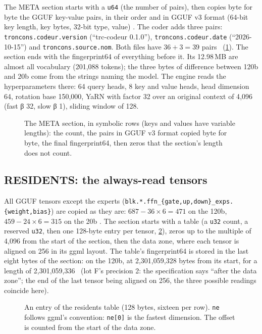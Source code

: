 The META section starts with a \texttt{u64} (the number of pairs), then copies byte for byte the GGUF key-value pairs, in their order and in GGUF v3 format (64-bit key length, key bytes, 32-bit type, value) \cite{ggml_gguf}. The coder adds three pairs: \nolinkurl{troncons.codeur.version} (``trc-codeur 0.1.0''), \nolinkurl{troncons.codeur.date} (``2026-10-15'') and \nolinkurl{troncons.source.nom}. Both files have $36 + 3 = 39$ pairs \mes~(\cref{t2fmt:fig:meta}). The section ends with the fingerprint64 of everything before it. Its 12.98\,MB are almost all vocabulary (201{,}088 tokens); the three bytes of difference between 120b and 20b come from the strings naming the model. The engine reads the hyperparameters there: 64 query heads, 8 key and value heads, head dimension 64, rotation base 150{,}000, YaRN with factor 32 over an original context of 4{,}096 (fast β 32, slow β 1), sliding window of 128.

\begin{figure}[ht]
\centering
\TdFmtMeta
\caption[The META section]{The META section, in symbolic rows (keys and values have variable lengths): the count, the pairs in GGUF v3 format copied byte for byte, the final fingerprint64, then zeros that the section's length does not count.}
\label{t2fmt:fig:meta}
\end{figure}

\subsection{RESIDENTS: the always-read tensors}

All GGUF tensors except the experts (\nolinkurl{blk.*.ffn_{gate,up,down}_exps.{weight,bias}}) are copied as they are: $687 - 36 \times 6 = 471$ on the 120b, $459 - 24 \times 6 = 315$ on the 20b \calc. The section starts with a table (a \texttt{u32} count, a reserved \texttt{u32}, then one 128-byte entry per tensor, \cref{t2fmt:fig:resident}), zeros up to the multiple of 4{,}096 from the start of the section, then the data zone, where each tensor is aligned on 256 in its ggml layout. The table's fingerprint64 is stored in the last eight bytes of the section: on the 120b, at 2{,}301{,}059{,}328 bytes from its start, for a length of 2{,}301{,}059{,}336 \mes~(lot F's precision 2: the specification says ``after the data zone''; the end of the last tensor being aligned on 256, the three possible readings coincide here).

\begin{figure}[ht]
\centering
\TdFmtResident
\caption[An entry of the residents table]{An entry of the residents table (128 bytes, sixteen per row). \texttt{ne} follows ggml's convention: \texttt{ne[0]} is the fastest dimension. The offset is counted from the start of the data zone.}
\label{t2fmt:fig:resident}
\end{figure}

